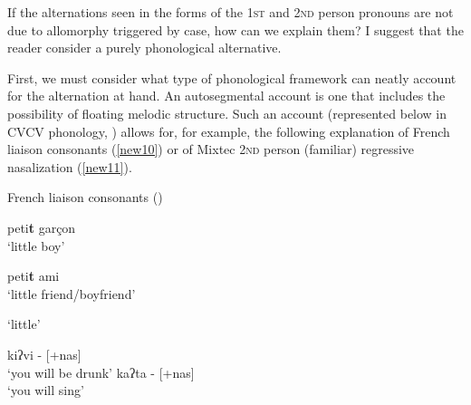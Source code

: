 \documentclass[output=paper]{langscibook}
\begin{document}
If the alternations seen in the forms of the 1\textsc{st} and 2\textsc{nd} person pronouns are not due to allomorphy triggered by case, how can we explain them? I suggest that the reader consider a purely phonological alternative. 

First, we must consider what type of phonological framework can neatly account for the alternation at hand. An autosegmental account is one that includes the possibility of floating melodic structure. Such an account (represented below in CVCV phonology, \citealt{lowenstamm1996cv,scheer2004lateral,scheer2009external}) allows for, for example, the following explanation of French liaison consonants (\ref{new10}) or of Mixtec 2\textsc{nd} person (familiar) regressive nasalization (\ref{new11}).

\newpage
\begin{exe}
\ex \label{new10}French liaison consonants (\citealt{encreve1983liaison})
\begin{xlist}
\ex \label{new10a}
peti\textbf{t} garçon \\
\glt ‘little boy’ 

\ex \label{new10b}
peti\textbf{t} ami\\
\glt ‘little friend/boyfriend’

\ex \label{new10c}
\relax [pǝti]
\glt `little' \\
{
}

\end{xlist}
\end{exe}

\begin{exe}
\ex \label{new11}\citep[68]{piggott1992variability}
\begin{xlist}
\ex \label{new11a}
kiʔvi - [+nas]\\\relax[kĩʔvĩ] \glt ‘you will be drunk’
{\ex \label{new11b}
kaʔta - [+nas]\\\relax[kaʔtã]\glt‘you will sing’}
\end{xlist}
\end{exe}
\end{document}
